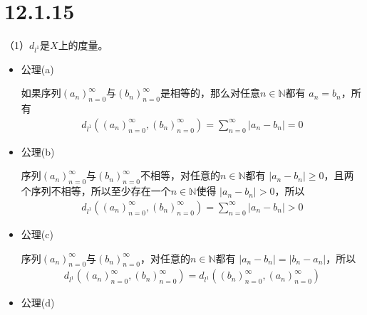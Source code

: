 \documentclass{article}
\begin{document}
\section*{12.1.15}

（1）$d_{l^1}$是$X$上的度量。
\begin{itemize}
      \item 公理(a)

            如果序列$(a_n)_{n=0}^\infty$与$(b_n)_{n=0}^\infty$是相等的，那么对任意$n \in \mathbb{N}$都有
            $a_n = b_n$，所有
            \begin{align*}
                  d_{l^1}((a_n)_{n = 0}^\infty, (b_n)_{n = 0}^\infty) = \sum \limits_{n = 0}^\infty |a_n - b_n| = 0
            \end{align*}

      \item 公理(b)

            序列$(a_n)_{n=0}^\infty$与$(b_n)_{n=0}^\infty$不相等，对任意的$n \in \mathbb{N}$都有
            $|a_n - b_n| \geq 0$，且两个序列不相等，所以至少存在一个$n \in \mathbb{N}$使得
            $|a_n - b_n| > 0$，所以
            \begin{align*}
                  d_{l^1}((a_n)_{n = 0}^\infty, (b_n)_{n = 0}^\infty) = \sum \limits_{n = 0}^\infty |a_n - b_n| > 0
            \end{align*}

      \item 公理(c)

            序列$(a_n)_{n=0}^\infty$与$(b_n)_{n=0}^\infty$，对任意的$n \in \mathbb{N}$都有
            $|a_n - b_n| = |b_n - a_n|$，所以
            \begin{align*}
                  d_{l^1}((a_n)_{n = 0}^\infty, (b_n)_{n = 0}^\infty) = d_{l^1}((b_n)_{n = 0}^\infty, (a_n)_{n = 0}^\infty)
            \end{align*}

      \item 公理(d)


\end{itemize}
\end{document}
